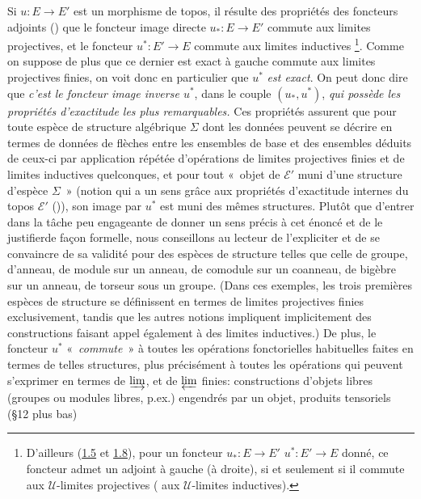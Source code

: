 \documentclass[10pt]{../fichiers-configuration-latex/smfart}
\begin{document}
\subsubsection{}
Si $u:E\rightarrow E'$ est un morphisme de topos, il résulte des
propriétés des foncteurs adjoints () que le
foncteur image directe $u_{\ast}:E\rightarrow E'$ commute aux
limites projectives, et le foncteur $u^{\ast}:E'\rightarrow E$
commute aux limites inductives \footnote[2]{D'ailleurs
(\hyperref[IV.cor1.5]{1.5} et \hyperref[IV.rem1.8]{1.8}), pour un foncteur
$u_{\ast}:E\rightarrow E'$ \resp $u^{\ast}:E'\rightarrow E$ donné,
ce foncteur admet un adjoint à gauche (\resp à droite), si et
seulement si il commute aux $𝒰$-limites projectives (\resp
aux $𝒰$-limites inductives).}\label{sga4[1]}. Comme on
suppose de plus que ce dernier est exact à gauche \ie commute aux
limites projectives finies, on voit donc en particulier que
$u^{\ast}$ \emph{est exact}. On peut donc dire que \emph{c'est le
foncteur image inverse $u^{\ast}$}, dans le couple $(u_{\ast},
u^{\ast})$, \emph{qui possède les propriétés d'exactitude les plus
remarquables.} Ces propriétés assurent que pour toute espèce de
structure algébrique $\Sigma$ dont les données peuvent se décrire en
termes de données de flèches entre les ensembles de base et des
ensembles déduits de ceux-ci par application répétée d'opérations de
limites projectives finies et de limites inductives quelconques, et
pour tout « objet de $ℰ'$ muni d'une structure d'espèce
$\Sigma$ » (notion qui a un sens grâce aux propriétés d'exactitude
internes du topos $ℰ'$ ()), son image par
$u^{\ast}$ est muni des mêmes structures. Plutôt que d'entrer dans
la tâche peu engageante de donner un sens précis à cet énoncé et de
le justifier\pageoriginale de façon formelle, nous conseillons au
lecteur de l'expliciter et de se convaincre de sa validité pour des
espèces de structure telles que celle de groupe, d'anneau, de module
sur un anneau, de comodule sur un coanneau, de bigèbre sur un anneau,
de torseur sous un groupe. (Dans ces exemples, les trois premières
espèces de structure se définissent en termes de limites projectives
finies exclusivement, tandis que les autres notions impliquent
implicitement des constructions faisant appel également à des
limites inductives.) De plus, le foncteur $u^{\ast}$ « \emph{commute} »  à toutes les opérations fonctorielles
habituelles faites en termes de telles structures, plus précisément
à toutes les opérations qui peuvent s'exprimer en termes de
$\varinjlim$, et de $\varprojlim$ finies: constructions d'objets
libres (groupes ou modules libres, p.ex.) engendrés par un objet,
produits tensoriels (\cf \S 12 plus bas) \etcn
\end{document}
